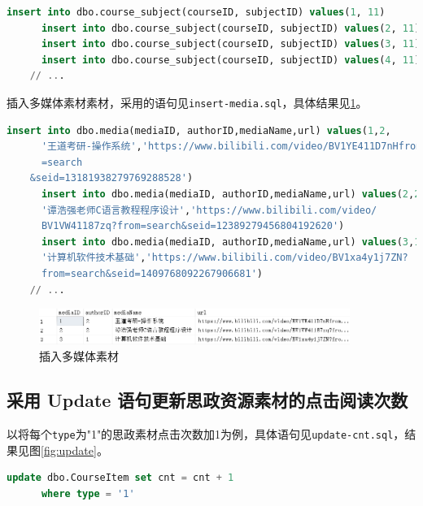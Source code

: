 \documentclass[11pt]{article}
\begin{document}
  \begin{file}
    \begin{lstlisting}[language=sql]
      insert into dbo.course_subject(courseID, subjectID) values(1, 11)
      insert into dbo.course_subject(courseID, subjectID) values(2, 11)
      insert into dbo.course_subject(courseID, subjectID) values(3, 11)
      insert into dbo.course_subject(courseID, subjectID) values(4, 11)
    // ...
    \end{lstlisting}
  \end{file}

  插入多媒体素材素材，采用的语句见\verb|insert-media.sql|，具体结果见\ref{fig:insert-media}。

  \begin{file}
    \begin{lstlisting}[language=sql]
      insert into dbo.media(mediaID, authorID,mediaName,url) values(1,2,
      '王道考研-操作系统','https://www.bilibili.com/video/BV1YE411D7nHfrom
      =search
    &seid=13181938279769288528')
      insert into dbo.media(mediaID, authorID,mediaName,url) values(2,2,
      '谭浩强老师C语言教程程序设计','https://www.bilibili.com/video/
      BV1VW41187zq?from=search&seid=12389279456804192620')
      insert into dbo.media(mediaID, authorID,mediaName,url) values(3,1,
      '计算机软件技术基础','https://www.bilibili.com/video/BV1xa4y1j7ZN?
      from=search&seid=1409768092267906681')
    // ...
    \end{lstlisting}
  \end{file}

  \begin{figure}[h]
    \centering
    \includegraphics[width=0.9\textwidth]{insert-media.png}
    \caption{插入多媒体素材}
    \label{fig:insert-media}
  \end{figure}



  \subsection{采用 Update 语句更新思政资源素材的点击阅读次数}
  以将每个\verb|type|为"1"的思政素材点击次数加1为例，具体语句见\verb|update-cnt.sql|，结果见图\ref{fig:update}。

  \begin{file}
    \begin{lstlisting}[language=sql]
      update dbo.CourseItem set cnt = cnt + 1
      where type = '1'
    \end{lstlisting}
  \end{file}
\end{document}
